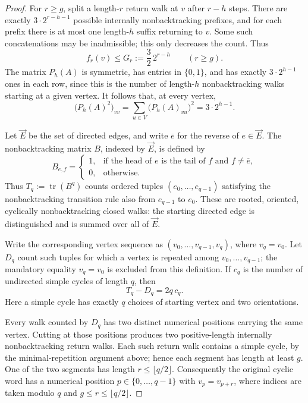 \documentclass[11pt,a4paper]{article}
\DeclareMathOperator{\tr}{tr}
\begin{document}
\begin{proof}
For $r\ge g$, split a length-$r$ return walk at $v$ after $r-h$ steps.
There are exactly $3\cdot2^{r-h-1}$ possible internally nonbacktracking
prefixes, and for each prefix there is at most one length-$h$ suffix
returning to $v$. Some such concatenations may be inadmissible; this
only decreases the count. Thus
\begin{equation}\label{eq:combinatorial-bound}
 f_r(v)\le G_r:=\frac32\,2^{r-h}\qquad(r\ge g).
\end{equation}
The matrix $P_h(A)$ is symmetric, has entries in $\{0,1\}$, and has
exactly $3\cdot2^{h-1}$ ones in each row, since this is the number of
length-$h$ nonbacktracking walks starting at a given vertex. It follows
that, at every vertex,
\begin{equation}\label{eq:local-moment}
 \bigl(P_h(A)^2\bigr)_{vv}
 =\sum_{u\in V}\bigl(P_h(A)_{vu}\bigr)^2
 =3\cdot2^{h-1}.
\end{equation}

Let $\vec E$ be the set of directed edges, and write $\overline e$ for
the reverse of $e\in\vec E$. The nonbacktracking matrix $B$, indexed by
$\vec E$, is defined by
\[
 B_{e,f}=
 \begin{cases}
 1,&\text{if the head of $e$ is the tail of $f$ and }f\ne\overline e,\\
 0,&\text{otherwise.}
 \end{cases}
\]
Thus $T_q:=\tr(B^q)$ counts ordered tuples
$(e_0,\ldots,e_{q-1})$ satisfying the nonbacktracking transition rule
also from $e_{q-1}$ to $e_0$. These are rooted, oriented, cyclically
nonbacktracking closed walks: the starting directed edge is
distinguished and is summed over all of $\vec E$.

Write the corresponding vertex sequence as
$(v_0,\ldots,v_{q-1},v_q)$, where $v_q=v_0$.
Let $D_q$ count such tuples for which a vertex is repeated among
$v_0,\ldots,v_{q-1}$; the mandatory equality $v_q=v_0$ is excluded from
this definition. If $c_q$ is the number of undirected simple cycles of
length $q$, then
\begin{equation}\label{eq:simple-cycle-count}
 T_q-D_q=2q\,c_q.
\end{equation}
Here a simple cycle has exactly $q$ choices of starting vertex and two
orientations.

Every walk counted by $D_q$ has two distinct numerical positions carrying
the same vertex. Cutting at those positions produces two positive-length
internally nonbacktracking return walks. Each such return walk contains
a simple cycle, by the minimal-repetition argument above; hence each
segment has length at least $g$. One of the two segments has length
$r\le\lfloor q/2\rfloor$. Consequently the original cyclic word has a
numerical position $p\in\{0,\ldots,q-1\}$ with $v_p=v_{p+r}$, where
indices are taken modulo $q$ and $g\le r\le\lfloor q/2\rfloor$.


\end{proof}
\end{document}
